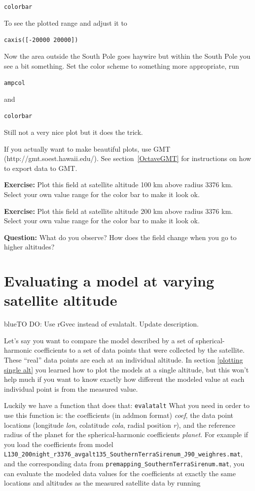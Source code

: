 \documentclass[11pt]{article}
\newcommand{\COMON}{\begin{color}{blue}TO DO: }
\newcommand{\COMOFF}{\end{color}}
\begin{document}
\qquad\verb+colorbar+

To see the plotted range and adjust it to

\qquad\verb+caxis([-20000 20000])+

Now the area outside the South Pole goes haywire but within the South Pole you see a bit something. Set the color scheme to something more appropriate, run 

\qquad\verb+ampcol+

and 

\qquad\verb+colorbar+

Still not a very nice plot but it does the trick.

If you actually want to make beautiful plots, use GMT \\(http://gmt.soest.hawaii.edu/). See section~\ref{OctaveGMT} for instructions on how to export data to GMT.

\textbf{Exercise:} Plot this field at satellite altitude 100 km above radius 3376 km. Select your own value range for the color bar to make it look ok. 

\textbf{Exercise:} Plot this field at satellite altitude 200 km above radius 3376 km. Select your own value range for the color bar to make it look ok. 

\textbf{Question:} What do you observe? How does the field change when you go to higher altitudes?

\section{Evaluating a model at varying satellite altitude}

\COMON
Use rGvec instead of evalatalt. Update description.
\COMOFF

Let's say you want to compare the model described by a set of spherical-harmonic coefficients to a set of data points that were collected by the satellite. These ``real'' data points are each at an individual altitude. In section \ref{plotting single alt} you learned how to plot the models at a single altitude, but this won't help much if you want to know exactly how different the modeled value at each individual point is from the measured value. 

Luckily we have a function that does that: \verb+evalatalt+ 
 What you need in order to use this function is: the coefficients (in addmon format) \emph{coef}, the data point locations (longitude \emph{lon}, colatitude \emph{cola}, radial position \emph{r}), and the reference radius of the planet for the spherical-harmonic coefficients \emph{planet}. For example if you load the coefficients from model\\
  \verb+L130_200night_r3376_avgalt135_SouthernTerraSirenum_J90_weighres.mat+,\\
and the corresponding data from \verb+premapping_SouthernTerraSirenum.mat+, you can evaluate the modeled data values for the coefficients at exactly the same locations and altitudes as the measured satellite data by running
\end{document}

